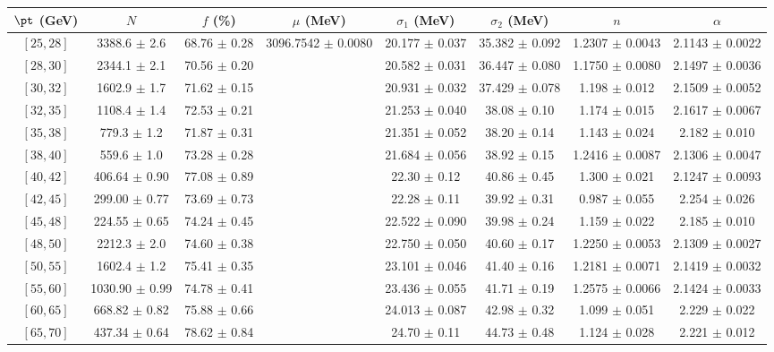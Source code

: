 \begin{tabular}{c||c|c|c|c|c|c|c}
$\pt$ (GeV) & $N$ & $f$ (\%) & $\mu$ (MeV) & $\sigma_1$ (MeV) & $\sigma_2$ (MeV) & $n$ & $\alpha$ \\
\hline
$[25, 28]$ & 3388.6 $\pm$ 2.6 & 68.76 $\pm$ 0.28 & \multirow{19}{*}{3096.7542 $\pm$ 0.0080} & 20.177 $\pm$ 0.037 & 35.382 $\pm$ 0.092 & 1.2307 $\pm$ 0.0043 & 2.1143 $\pm$ 0.0022\\
$[28, 30]$ & 2344.1 $\pm$ 2.1 & 70.56 $\pm$ 0.20 &  & 20.582 $\pm$ 0.031 & 36.447 $\pm$ 0.080 & 1.1750 $\pm$ 0.0080 & 2.1497 $\pm$ 0.0036\\
$[30, 32]$ & 1602.9 $\pm$ 1.7 & 71.62 $\pm$ 0.15 &  & 20.931 $\pm$ 0.032 & 37.429 $\pm$ 0.078 & 1.198 $\pm$ 0.012 & 2.1509 $\pm$ 0.0052\\
$[32, 35]$ & 1108.4 $\pm$ 1.4 & 72.53 $\pm$ 0.21 &  & 21.253 $\pm$ 0.040 & 38.08 $\pm$ 0.10 & 1.174 $\pm$ 0.015 & 2.1617 $\pm$ 0.0067\\
$[35, 38]$ & 779.3 $\pm$ 1.2 & 71.87 $\pm$ 0.31 &  & 21.351 $\pm$ 0.052 & 38.20 $\pm$ 0.14 & 1.143 $\pm$ 0.024 & 2.182 $\pm$ 0.010\\
$[38, 40]$ & 559.6 $\pm$ 1.0 & 73.28 $\pm$ 0.28 &  & 21.684 $\pm$ 0.056 & 38.92 $\pm$ 0.15 & 1.2416 $\pm$ 0.0087 & 2.1306 $\pm$ 0.0047\\
$[40, 42]$ & 406.64 $\pm$ 0.90 & 77.08 $\pm$ 0.89 &  & 22.30 $\pm$ 0.12 & 40.86 $\pm$ 0.45 & 1.300 $\pm$ 0.021 & 2.1247 $\pm$ 0.0093\\
$[42, 45]$ & 299.00 $\pm$ 0.77 & 73.69 $\pm$ 0.73 &  & 22.28 $\pm$ 0.11 & 39.92 $\pm$ 0.31 & 0.987 $\pm$ 0.055 & 2.254 $\pm$ 0.026\\
$[45, 48]$ & 224.55 $\pm$ 0.65 & 74.24 $\pm$ 0.45 &  & 22.522 $\pm$ 0.090 & 39.98 $\pm$ 0.24 & 1.159 $\pm$ 0.022 & 2.185 $\pm$ 0.010\\
$[48, 50]$ & 2212.3 $\pm$ 2.0 & 74.60 $\pm$ 0.38 &  & 22.750 $\pm$ 0.050 & 40.60 $\pm$ 0.17 & 1.2250 $\pm$ 0.0053 & 2.1309 $\pm$ 0.0027\\
$[50, 55]$ & 1602.4 $\pm$ 1.2 & 75.41 $\pm$ 0.35 &  & 23.101 $\pm$ 0.046 & 41.40 $\pm$ 0.16 & 1.2181 $\pm$ 0.0071 & 2.1419 $\pm$ 0.0032\\
$[55, 60]$ & 1030.90 $\pm$ 0.99 & 74.78 $\pm$ 0.41 &  & 23.436 $\pm$ 0.055 & 41.71 $\pm$ 0.19 & 1.2575 $\pm$ 0.0066 & 2.1424 $\pm$ 0.0033\\
$[60, 65]$ & 668.82 $\pm$ 0.82 & 75.88 $\pm$ 0.66 &  & 24.013 $\pm$ 0.087 & 42.98 $\pm$ 0.32 & 1.099 $\pm$ 0.051 & 2.229 $\pm$ 0.022\\
$[65, 70]$ & 437.34 $\pm$ 0.64 & 78.62 $\pm$ 0.84 &  & 24.70 $\pm$ 0.11 & 44.73 $\pm$ 0.48 & 1.124 $\pm$ 0.028 & 2.221 $\pm$ 0.012\\

\end{tabular}
